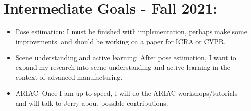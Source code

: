 \documentclass[11pt]{article}
\begin{document}
\section{Intermediate Goals - Fall 2021:}
\begin{itemize}
      \item Pose estimation: I must be finished with implementation, perhaps make some improvements, and should be working on a paper for ICRA or CVPR.
      \item Scene understanding and active learning: After pose estimation, I want to expand my research into scene understanding and active learning in the context of advanced manufacturing.
      \item ARIAC: Once I am up to speed, I will do the ARIAC workshops/tutorials and will talk to Jerry about possible contributions.
\end{itemize}


\newpage


\end{document}
